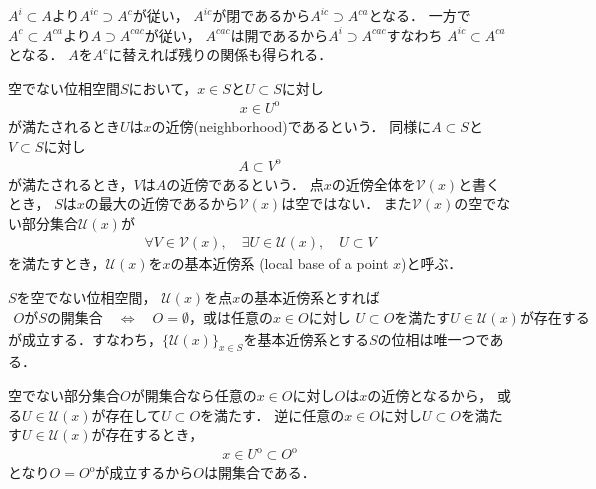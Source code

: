 	\begin{prf}
		$A^i \subset A$より$A^{ic} \supset A^c$が従い，
		$A^{ic}$が閉であるから$A^{ic} \supset A^{ca}$となる．
		一方で$A^c \subset A^{ca}$より$A \supset A^{cac}$が従い，
		$A^{cac}$は開であるから$A^i \supset A^{cac}$すなわち
		$A^{ic} \subset A^{ca}$となる．
		$A$を$A^c$に替えれば残りの関係も得られる．
		\QED
	\end{prf}
	
	\begin{screen}
		\begin{dfn}[近傍・基本近傍系]
			空でない位相空間$S$において，$x \in S$と$U \subset S$に対し
			\begin{align}
				x \in U^{\mathrm{o}}
			\end{align}
			が満たされるとき$U$は$x$の近傍(neighborhood)であるという．
			同様に$A \subset S$と$V \subset S$に対し
			\begin{align}
				A \subset V^{\mathrm{o}}
			\end{align}
			が満たされるとき，$V$は$A$の近傍であるという．
			点$x$の近傍全体を$\mathscr{V}(x)$と書くとき，
			$S$は$x$の最大の近傍であるから$\mathscr{V}(x)$は空ではない．
			また$\mathscr{V}(x)$の空でない部分集合$\mathscr{U}(x)$が
			\begin{align}
				\forall V \in \mathscr{V}(x),
				\quad \exists U \in \mathscr{U}(x),
				\quad U \subset V
			\end{align}
			を満たすとき，$\mathscr{U}(x)$を$x$の基本近傍系
			(local base of a point $x$)と呼ぶ．
		\end{dfn}
	\end{screen}
	
	\begin{screen}
		\begin{thm}[基本近傍系は開集合を決定する]\label{thm:local_base_defines_open_sets}
			$S$を空でない位相空間，
			$\mathscr{U}(x)$を点$x$の基本近傍系とすれば
			\begin{align}
				\mbox{$O$が$S$の開集合} \quad \Longleftrightarrow \quad 
				\mbox{$O = \emptyset$，或は任意の$x \in O$に対し
				$U \subset O$を満たす$U \in \mathscr{U}(x)$が存在する}
			\end{align}
			が成立する．すなわち，$\{\mathscr{U}(x)\}_{x \in S}$を基本近傍系とする$S$の位相は唯一つである．
		\end{thm}
	\end{screen}
	
	\begin{prf}
		空でない部分集合$O$が開集合なら任意の$x \in O$に対し$O$は$x$の近傍となるから，
		或る$U \in \mathscr{U}(x)$が存在して$U \subset O$を満たす．
		逆に任意の$x \in O$に対し$U \subset O$を満たす$U \in \mathscr{U}(x)$が存在するとき，
		\begin{align}
			x \in U^{\mathrm{o}} \subset O^{\mathrm{o}}
		\end{align}
		となり$O = O^{\mathrm{o}}$が成立するから$O$は開集合である．
		\QED
	\end{prf}
	
